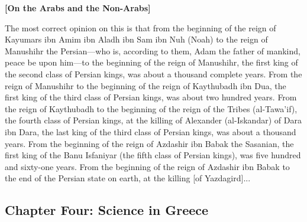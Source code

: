\documentclass[11pt,a4paper]{article}
\begin{document}
\textbf{[On the Arabs and the Non-Arabs]}

The most correct opinion on this is that from the beginning of the reign of Kayumars ibn Amim ibn Aladh ibn Sam ibn Nuh (Noah) to the reign of Manushihr the Persian---who is, according to them, Adam the father of mankind, peace be upon him---to the beginning of the reign of Manushihr, the first king of the second class of Persian kings, was about a thousand complete years. From the reign of Manushihr to the beginning of the reign of Kaythubadh ibn Dua, the first king of the third class of Persian kings, was about two hundred years. From the reign of Kaythubadh to the beginning of the reign of the Tribes (al-Tawa'if), the fourth class of Persian kings, at the killing of Alexander (al-Iskandar) of Dara ibn Dara, the last king of the third class of Persian kings, was about a thousand years. From the beginning of the reign of Azdashir ibn Babak the Sasanian, the first king of the Banu Isfaniyar (the fifth class of Persian kings), was five hundred and sixty-one years. From the beginning of the reign of Azdashir ibn Babak to the end of the Persian state on earth, at the killing [of Yazdagird]...

\clearpage

\subsection*{Chapter Four: Science in Greece}

{\arabicfont{}}
\end{document}
